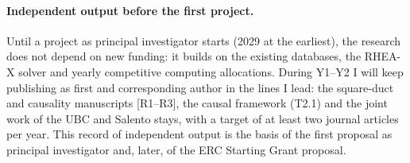 \documentclass[11pt]{article}
\begin{document}
\paragraph{Independent output before the first project.} Until a project as principal
investigator starts (2029 at the earliest), the research does not depend on new funding: it
builds on the existing databases, the RHEA-X solver and yearly competitive computing
allocations. During Y1--Y2 I will keep publishing as first and corresponding author in the
lines I lead: the square-duct and causality manuscripts [R1--R3], the causal framework
(T2.1) and the joint work of the UBC and Salento stays, with a target of at least two journal
articles per year. This record of independent output is the basis of the first proposal as
principal investigator and, later, of the ERC Starting Grant proposal.
\end{document}
